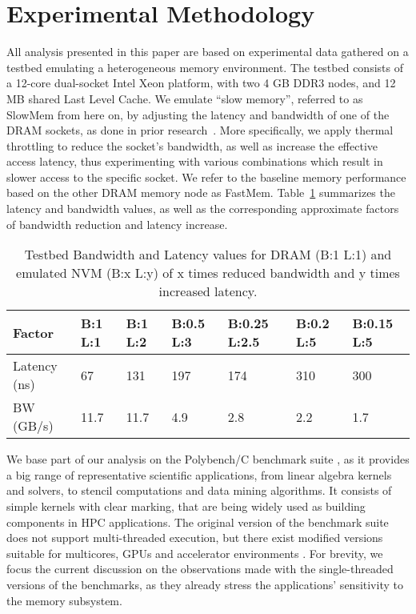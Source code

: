 \section{Experimental Methodology}
\label{sec:methodology}

All analysis presented in this paper are based on experimental data gathered on a
testbed emulating 
a heterogeneous memory environment. 
The testbed consists of 
a 12-core dual-socket Intel Xeon platform, with two 4 GB DDR3
nodes, and 12 MB shared Last Level Cache. We emulate ``slow memory'', referred to as
SlowMem from here on,  by adjusting
the latency and bandwidth of one of the DRAM sockets, as done in prior
research~\cite{Kannan:pVM, sudarsun:isca17}.
More specifically, we apply thermal throttling to reduce the socket's bandwidth, as well as increase the effective access latency, 
thus experimenting with various combinations which result in slower access to the specific socket.
We refer to the baseline memory performance based on the other DRAM memory node as FastMem. 
Table~\ref{tab:throttle} summarizes the latency and bandwidth values, as well as the corresponding approximate 
factors of bandwidth reduction and latency increase.\\

\begin{table}[t]
\centering
\begin{tabular}{|p{1.6cm}|p{0.6cm}|p{0.6cm}|p{0.8cm}|p{0.7cm}|p{0.7cm}|p{0.7cm}|}
\hline
Factor & B:1 L:1 & B:1 L:2 & B:0.5 L:3 & B:0.25 L:2.5 & B:0.2 L:5 & B:0.15 L:5\\ \hline
Latency (ns) & 67 & 131 	& 197 		& 174 		& 310 	& 300 \\ \hline
BW (GB/s) & 11.7 & 11.7 	& 4.9 		& 2.8 		& 2.2 	& 1.7\\ \hline
\end{tabular}
\caption{Testbed Bandwidth and Latency values for DRAM (B:1 L:1) and emulated NVM (B:x L:y) of 
x times reduced bandwidth and y times increased latency.}
\label{tab:throttle}
\vspace{-0.3in}
\end{table}

We base part of our analysis on the Polybench/C benchmark suite \cite{polybench}, as it provides a big range of representative scientific applications, from linear algebra kernels and solvers, 
to stencil computations and data mining algorithms. It consists of simple kernels with clear marking, that are being widely used as building components in HPC applications. 
The original version of the benchmark suite does not support
multi-threaded execution, but there exist modified versions suitable
for multicores, GPUs and accelerator environments \cite{polybench:gpu}. For
brevity, we focus
the current discussion on the observations made with the
single-threaded versions of the benchmarks, as they already
stress the applications' sensitivity to the memory subsystem. 

